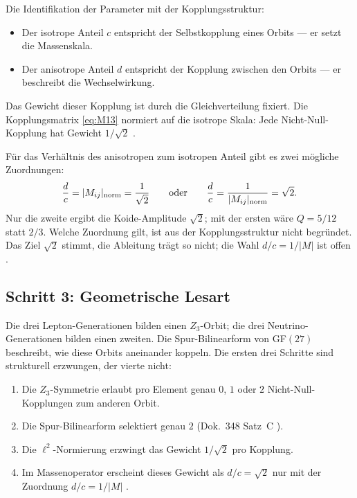 Die Identifikation der Parameter mit der Kopplungsstruktur:
\begin{itemize}
  \item Der isotrope Anteil $c$ entspricht der Selbstkopplung eines Orbits
    --- er setzt die Massenskala.
  \item Der anisotrope Anteil $d$ entspricht der Kopplung zwischen den
    Orbits --- er beschreibt die Wechselwirkung.
\end{itemize}

Das Gewicht dieser Kopplung ist durch die Gleichverteilung fixiert.
Die Kopplungsmatrix \eqref{eq:M13} normiert auf die isotrope Skala:
Jede Nicht-Null-Kopplung hat Gewicht $1/\sqrt{2}$ \BM.

Für das Verhältnis des anisotropen zum isotropen Anteil gibt es zwei mögliche
Zuordnungen:
\begin{equation}
  \frac{d}{c} = |M_{ij}|_{\rm norm} = \frac{1}{\sqrt{2}}
  \qquad\text{oder}\qquad
  \frac{d}{c} = \frac{1}{|M_{ij}|_{\rm norm}} = \sqrt{2}.
  \label{eq:dc}
\end{equation}
Nur die zweite ergibt die Koide-Amplitude $\sqrt{2}$; mit der ersten wäre
$Q = 5/12$ statt $2/3$. Welche Zuordnung gilt, ist aus der Kopplungsstruktur
nicht begründet. Das Ziel $\sqrt{2}$ stimmt, die Ableitung trägt so nicht;
die Wahl $d/c = 1/|M|$ ist offen \SM.

\subsection*{Schritt 3: Geometrische Lesart}

Die drei Lepton-Generationen bilden einen $Z_3$-Orbit; die drei
Neutrino-Generationen bilden einen zweiten. Die Spur-Bilinearform
von GF$(27)$ beschreibt, wie diese Orbits aneinander koppeln.
Die ersten drei Schritte sind strukturell erzwungen, der vierte nicht:

\begin{enumerate}
  \item Die $Z_3$-Symmetrie erlaubt pro Element genau $0$, $1$ oder $2$
    Nicht-Null-Kopplungen zum anderen Orbit.
  \item Die Spur-Bilinearform selektiert genau $2$ (Dok.~348 Satz~C \BM).
  \item Die $\ell^2$-Normierung erzwingt das Gewicht $1/\sqrt{2}$ pro Kopplung.
  \item Im Massenoperator erscheint dieses Gewicht als $d/c = \sqrt{2}$ nur
    mit der Zuordnung $d/c = 1/|M|$ \SM.
\end{enumerate}

